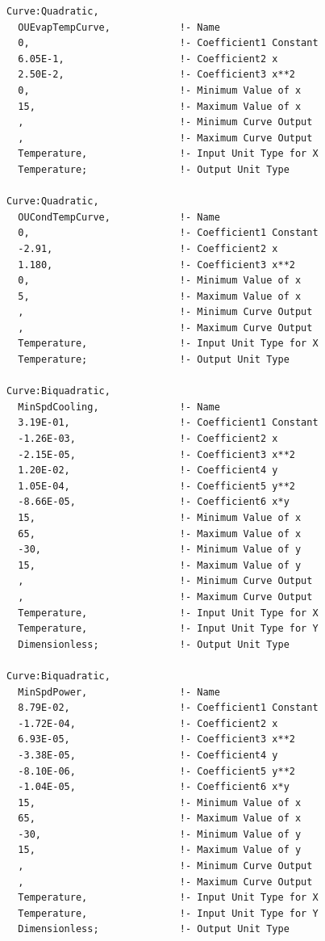\begin{lstlisting}
Curve:Quadratic,
  OUEvapTempCurve,            !- Name
  0,                          !- Coefficient1 Constant
  6.05E-1,                    !- Coefficient2 x
  2.50E-2,                    !- Coefficient3 x**2
  0,                          !- Minimum Value of x
  15,                         !- Maximum Value of x
  ,                           !- Minimum Curve Output
  ,                           !- Maximum Curve Output
  Temperature,                !- Input Unit Type for X
  Temperature;                !- Output Unit Type

Curve:Quadratic,
  OUCondTempCurve,            !- Name
  0,                          !- Coefficient1 Constant
  -2.91,                      !- Coefficient2 x
  1.180,                      !- Coefficient3 x**2
  0,                          !- Minimum Value of x
  5,                          !- Maximum Value of x
  ,                           !- Minimum Curve Output
  ,                           !- Maximum Curve Output
  Temperature,                !- Input Unit Type for X
  Temperature;                !- Output Unit Type

Curve:Biquadratic,
  MinSpdCooling,              !- Name
  3.19E-01,                   !- Coefficient1 Constant
  -1.26E-03,                  !- Coefficient2 x
  -2.15E-05,                  !- Coefficient3 x**2
  1.20E-02,                   !- Coefficient4 y
  1.05E-04,                   !- Coefficient5 y**2
  -8.66E-05,                  !- Coefficient6 x*y
  15,                         !- Minimum Value of x
  65,                         !- Maximum Value of x
  -30,                        !- Minimum Value of y
  15,                         !- Maximum Value of y
  ,                           !- Minimum Curve Output
  ,                           !- Maximum Curve Output
  Temperature,                !- Input Unit Type for X
  Temperature,                !- Input Unit Type for Y
  Dimensionless;              !- Output Unit Type

Curve:Biquadratic,
  MinSpdPower,                !- Name
  8.79E-02,                   !- Coefficient1 Constant
  -1.72E-04,                  !- Coefficient2 x
  6.93E-05,                   !- Coefficient3 x**2
  -3.38E-05,                  !- Coefficient4 y
  -8.10E-06,                  !- Coefficient5 y**2
  -1.04E-05,                  !- Coefficient6 x*y
  15,                         !- Minimum Value of x
  65,                         !- Maximum Value of x
  -30,                        !- Minimum Value of y
  15,                         !- Maximum Value of y
  ,                           !- Minimum Curve Output
  ,                           !- Maximum Curve Output
  Temperature,                !- Input Unit Type for X
  Temperature,                !- Input Unit Type for Y
  Dimensionless;              !- Output Unit Type


\end{lstlisting}

